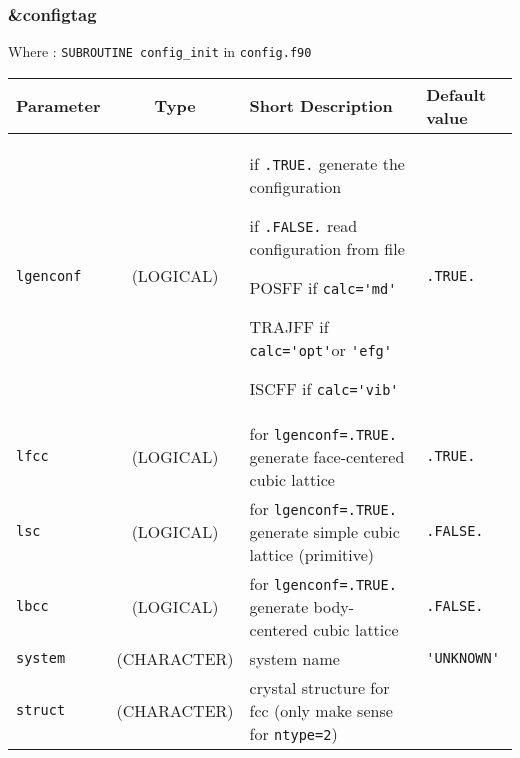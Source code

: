 \documentclass[a4paper]{article}
\begin{document}
\subsubsection{\&configtag}

Where : \verb?SUBROUTINE config_init? in \verb?config.f90?
\newline

\begin{longtable}{l|c|m{8cm}|m{2cm}}
\hline
\hline
Parameter        &  Type              &          Short Description                                                          & Default value \\
\hline
\hline
\rule[-0.75cm]{0cm}{1.5cm}
\verb?lgenconf?  & (LOGICAL)          & \newline if \verb?.TRUE.? generate the configuration \newline

                                      if \verb?.FALSE.? read configuration from file \newline

				      POSFF if \verb?calc='md'? \newline

				      TRAJFF if \verb?calc='opt'?or \verb?'efg'? \newline

				      ISCFF if \verb?calc='vib'?  \newline                                                  & \verb?.TRUE.? \tabularnewline
\hline
\rule[-0.75cm]{0cm}{1.5cm}
\verb?lfcc?      & (LOGICAL)         & for \verb?lgenconf=.TRUE.?  generate face-centered cubic lattice                     & \verb?.TRUE.? \\
\hline
\rule[-0.75cm]{0cm}{1.5cm}
\verb?lsc?       & (LOGICAL)         & for \verb?lgenconf=.TRUE.?  generate simple cubic lattice (primitive)                & \verb?.FALSE.? \\
\hline
\rule[-0.75cm]{0cm}{1.5cm}
\verb?lbcc?      & (LOGICAL)         & for \verb?lgenconf=.TRUE.?  generate body-centered cubic lattice                     & \verb?.FALSE.? \\
\hline
\rule[-0.75cm]{0cm}{1.5cm}
\verb?system?    & (CHARACTER)       & system name                                                                          & \verb?'UNKNOWN'? \\
\hline
\rule[-0.75cm]{0cm}{1.5cm}
\verb?struct?    & (CHARACTER)       & \newline crystal structure for fcc (only make sense for \verb?ntype=2?) \newline
           

\end{longtable}
\end{document}
